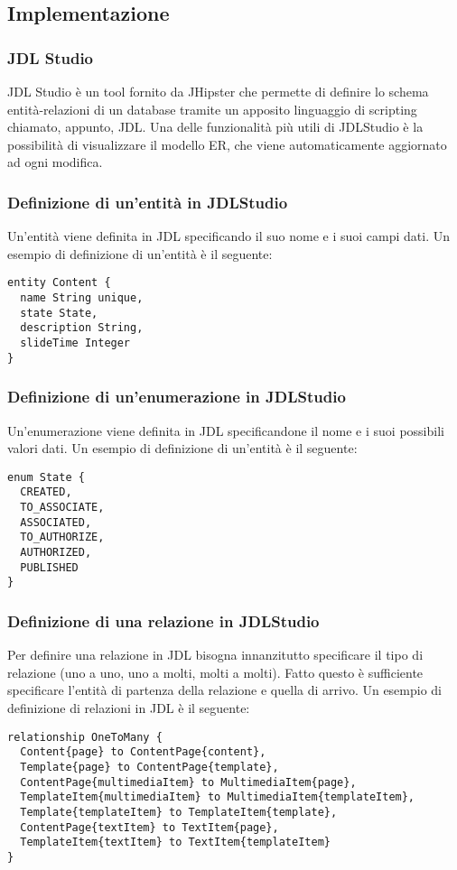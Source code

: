 \subsection{Implementazione}
\subsubsection{JDL Studio}
JDL Studio è un tool fornito da JHipster che permette di definire lo schema entità-relazioni di un database tramite un apposito linguaggio di scripting chiamato, appunto, JDL. Una delle funzionalità più utili di JDLStudio è la possibilità di visualizzare il modello ER, che viene automaticamente aggiornato ad ogni modifica.
\newpage
\subsubsection{Definizione di un'entità in JDLStudio}
Un'entità viene definita in JDL specificando il suo nome e i suoi campi dati. Un esempio di definizione di un'entità è il seguente:
\begin{lstlisting}[caption={Definizione entità Content},label={lst:ent}]
entity Content {
  name String unique,
  state State,
  description String,
  slideTime Integer
}
\end{lstlisting}
\subsubsection{Definizione di un'enumerazione in JDLStudio}
Un'enumerazione viene definita in JDL specificandone il nome e i suoi possibili valori dati. Un esempio di definizione di un'entità è il seguente:
\begin{lstlisting}[caption={Definizione enumerazione State},label={lst:ent}]
enum State {
  CREATED,
  TO_ASSOCIATE,
  ASSOCIATED,
  TO_AUTHORIZE,
  AUTHORIZED,
  PUBLISHED
}
\end{lstlisting}
\subsubsection{Definizione di una relazione in JDLStudio}
Per definire una relazione in JDL bisogna innanzitutto specificare il tipo di relazione (uno a uno, uno a molti, molti a molti). Fatto questo è sufficiente specificare l'entità di partenza della relazione e quella di arrivo. Un esempio di definizione di relazioni in JDL è il seguente:
\begin{lstlisting}[caption={Definizione relazioni uno a molti},label={lst:ent}]
relationship OneToMany {
  Content{page} to ContentPage{content},
  Template{page} to ContentPage{template},
  ContentPage{multimediaItem} to MultimediaItem{page},
  TemplateItem{multimediaItem} to MultimediaItem{templateItem},
  Template{templateItem} to TemplateItem{template},
  ContentPage{textItem} to TextItem{page},
  TemplateItem{textItem} to TextItem{templateItem}
}
\end{lstlisting}
\newpage
